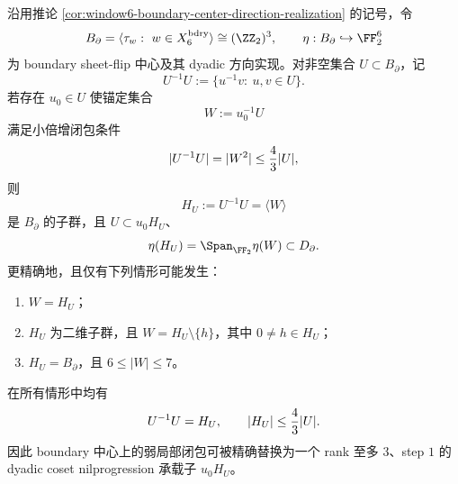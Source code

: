 \begin{theorem}\label{distill:breuillard_green_tao_approximate_groups_and_helfgott_growth-approximate_closure_implies_structured_carrier-boundary-center-sharp-small-doubling-carrier}
沿用推论 \ref{cor:window6-boundary-center-direction-realization} 的记号，令
\[
B_{\partial}=\langle \tau_w:\ w\in X_6^{\mathrm{bdry}}\rangle\cong(\ZZ_2)^3,
\qquad
\eta:B_{\partial}\hookrightarrow \FF_2^6
\]
为 boundary sheet-flip 中心及其 dyadic 方向实现。对非空集合 \(U\subset B_{\partial}\)，记
\[
U^{-1}U:=\{u^{-1}v:\ u,v\in U\}.
\]
若存在 \(u_0\in U\) 使锚定集合
\[
W:=u_0^{-1}U
\]
满足小倍增闭包条件
\[
|U^{-1}U|=|W^2|\le {4\over 3}|U|,
\]
则
\[
H_U:=U^{-1}U=\langle W\rangle
\]
是 \(B_{\partial}\) 的子群，且 \(U\subset u_0H_U\)、
\[
\eta(H_U)=\Span_{\FF_2}\eta(W)\subset D_{\partial}.
\]
更精确地，且仅有下列情形可能发生：
\begin{enumerate}
\item \(W=H_U\)；
\item \(H_U\) 为二维子群，且 \(W=H_U\setminus\{h\}\)，其中 \(0\ne h\in H_U\)；
\item \(H_U=B_{\partial}\)，且 \(6\le |W|\le 7\)。
\end{enumerate}
在所有情形中均有
\[
U^{-1}U=H_U,
\qquad
|H_U|\le {4\over 3}|U|.
\]
因此 boundary 中心上的弱局部闭包可被精确替换为一个 rank 至多 \(3\)、step \(1\) 的 dyadic coset nilprogression 承载子 \(u_0H_U\)。
\end{theorem}

